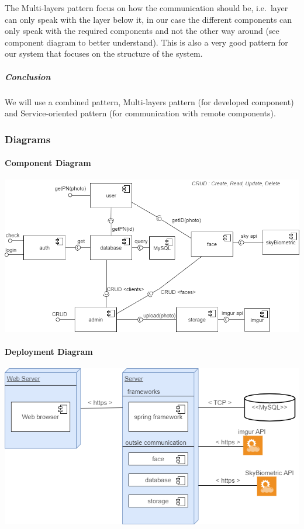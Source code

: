 \documentclass[a4paper,11pt]{article}
\begin{document}
The Multi-layers pattern focus on how the communication should be,
i.e.~layer can only speak with the layer below it, in our case the
different components can only speak with the required components and not
the other way around (see component diagram to better understand). This
is also a very good pattern for our system that focuses on the structure
of the system.

\subparagraph{Conclusion}\label{conclusion}

We will use a combined pattern, Multi-layers pattern (for developed
component) and Service-oriented pattern (for communication with remote
components).

\subsubsection{Diagrams}\label{diagrams}

\paragraph{Component Diagram}\label{component-diagram}

\includegraphics{Architecture/ComponentDiagram.png}

\paragraph{Deployment Diagram}\label{deployment-diagram}

\includegraphics{Architecture/DeploymentDiagram.png}
\end{document}
